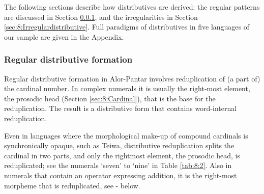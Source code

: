     

 

 

The following sections describe how distributives are derived: the regular patterns are discussed in Section \ref{sec:8:Regulardistributive}, and the irregularities in Section \ref{sec:8:Irregulardistributive}.  Full paradigms of distributives in five languages of our sample are given in the Appendix.

\subsubsection{Regular distributive formation  }
\label{sec:8:Regulardistributive}
Regular distributive formation in Alor-Pantar involves reduplication of (a part of) the cardinal number. In complex numerals it is usually the right-most element, the prosodic head (Section \ref{sec:8:Cardinal}), that is the base for the reduplication. The result is a distributive form that contains word-internal reduplication. 

Even in languages where the morphological make-up of compound cardinals is synchronically opaque, such as Teiwa, distributive reduplication splits the cardinal in two parts, and only the rightmost element, the prosodic head, is reduplicated; see the numerals `seven' to `nine' in Table \ref{tab:8:2}. Also in numerals that contain an operator expressing addition, it is the right-most morpheme that is reduplicated, see - below.
 


